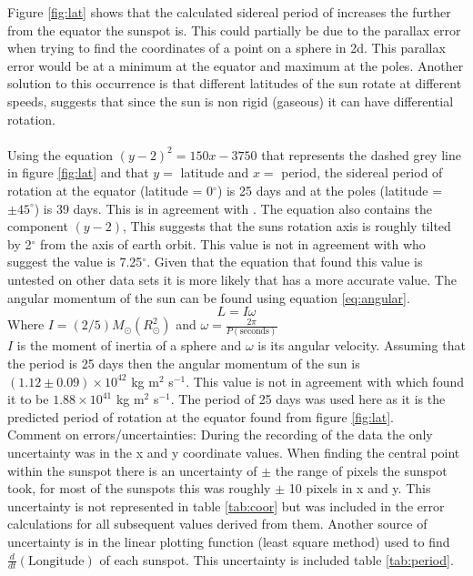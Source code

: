 \documentclass[10pt]{article}
\begin{document}
\noindent Figure \ref{fig:lat} shows that the calculated sidereal period of increases the further from the equator the sunspot is. This could partially be due to the parallax error when trying to find the coordinates of a point on a sphere in 2d. This parallax error would be at a minimum at the equator and maximum at the poles. Another solution to this occurrence is that different latitudes of the sun rotate at different speeds, \citet{Beck2000} suggests that since the sun is non rigid (gaseous) it can have differential rotation. \\\\
Using the equation $(y-2)^2 = 150x - 3750$ that represents the dashed grey line in figure \ref{fig:lat} and that $y=$ latitude and $x=$ period, the sidereal period of rotation at the equator (latitude = 0$^{\circ}$) is 25 days and at the poles (latitude = $\pm 45^{\circ}$) is 39 days. This is in agreement with \citet{latrotation}. The equation also contains the component $(y-2)$, This suggests that the suns rotation axis is roughly tilted by 2$^{\circ}$ from the axis of earth orbit. This value is not in agreement with \citet{dwilliams} who suggest the value is 7.25$^{\circ}$. Given that the equation that found this value is untested on other data sets it is more likely that \citet{dwilliams} has a more accurate value. The angular momentum of the sun can be found using equation \ref{eq:angular}.
\begin{equation}
	L = I \omega
	\label{eq:angular}
\end{equation}
Where \qquad \qquad \qquad $I = (2/5)M_{\odot}(R_{\odot}^2)$ \qquad \qquad and \qquad \qquad $\omega = \frac{2 \pi}{P(\text{seconds})}$ \\

\noindent$I$ is the moment of inertia of a sphere and $\omega$ is its angular velocity. Assuming that the period is 25 days then the angular momentum of the sun is $( 1.12 \pm 0.09)\times 10^{42}$ kg m$^2$ s$^{-1}$. This value is not in agreement with \citet{cang} which found it to be $1.88 \times 10^{41}$ kg m$^2$ s$^{-1}$. The period of 25 days was used here as it is the predicted period of rotation at the equator found from figure \ref{fig:lat}. \\

\noindent Comment on errors/uncertainties: During the recording of the data the only uncertainty was in the x and y coordinate values. When finding the central point within the sunspot there is an uncertainty of $\pm$ the range of pixels the sunspot took, for most of the sunspots this was roughly $\pm$ 10 pixels in x and y. This uncertainty is not represented in table \ref{tab:coor} but was included in the error calculations for all subsequent values derived from them. Another source of uncertainty is in the linear plotting function (least square method) used to find $\frac{d}{dt} ( \text{Longitude} )$ of each sunspot. This uncertainty is included table \ref{tab:period}.
\end{document}

